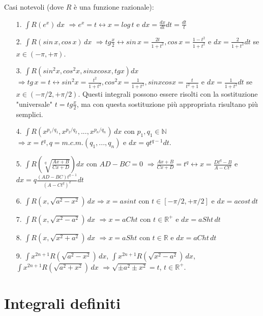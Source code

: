 \documentclass{article}
\theoremstyle{definition}
\theoremstyle{definition}
\theoremstyle{definition}
\theoremstyle{definition}
\theoremstyle{definition}
\theoremstyle{definition}
\begin{document}
Casi notevoli (dove $R$ è una funzione razionale):
\begin{itemize}
    \item [1.] $\displaystyle{\int R(e^x)\,dx}$ $\Longrightarrow e^x=t \longleftrightarrow x=log\,t$ e $\displaystyle{dx=\frac{dx}{dt}dt}=\frac{dt}{t}$
    \item [2.] $\displaystyle{\int R(sin\,x,cos\,x)\,dx}$ $\displaystyle{\Longrightarrow tg\frac{x}{2} \longleftrightarrow sin\,x=\frac{2t}{1+t^2}, cos\,x=\frac{1-t^2}{1+t^2}}$ e $\displaystyle{dx=\frac{2}{1+t^2}dt}$ se $x\in(-\pi,+\pi)$.
    \item [3.] $\displaystyle{\int R(sin^2x,cos^2x,sinxcosx,tgx)dx}$ $\displaystyle{\Longrightarrow tg\,x=t \longleftrightarrow sin^2x=\frac{t^2}{1+t^2}, cos^2x=\frac{1}{1+t^2}, sinxcosx=\frac{t}{t^2+1}}$ e $\displaystyle{dx=\frac{1}{1+t^2}dt}$ se $x\in(-\pi/2,+\pi/2)$.
    Questi integrali possono essere risolti con la sostituzione "universale" $t=tg\frac{x}{2}$, ma con questa sostituzione più appropriata risultano più semplici.
    \item [4.] $\displaystyle{\int R(x^{p_1/q_1},x^{p_2/q_2},...,x^{p_n/q_n})\,dx}$ con $p_1,q_1\in\mathbb{N}$ $\Longrightarrow x=t^q, q=m.c.m.(q_1,...,q_n)$ e $dx=qt^{q-1}dt$.
    \item [5.] $\displaystyle{\int R\left(\sqrt[q]{\frac{Ax+B}{Cx+D}}\right)dx}$ con $AD-BC=0$ $\Longrightarrow \displaystyle{\frac{Ax+B}{Cx+D}=t^q} \longleftrightarrow x=\frac{Dt^q-B}{A-Ct^q}$ e $\displaystyle{dx=q\frac{(AD-BC)t^{q-1}}{(A-Ct^q)^2}dt}$
    \item [6.] $\displaystyle{\int R(x,\sqrt{a^2-x^2})\,dx} \Longrightarrow x=asint$ con $t\in[-\pi/2,+\pi/2]$ e $dx=acost\,dt$
    \item [7.] $\displaystyle{\int R(x, \sqrt{x^2-a^2})\,dx}$ $\Longrightarrow x=aCht$ con $t\in\mathbb{R}^+$ e $dx=aSht\,dt$
    \item [8.] $\displaystyle{\int R(x,\sqrt{x^2+a^2})\,dx}$ $\Longrightarrow x=aSht$ con $t\in\mathbb{R}$ e $dx=aCht\,dt$
    \item [9.] $\displaystyle{\int x^{2n+1}R(\sqrt{a^2-x^2})\,dx}$, $\displaystyle{\int x^{2n+1}R(\sqrt{x^2-a^2})\,dx}$,$\displaystyle{\int x^{2n+1}R(\sqrt{a^2+x^2})\,dx}$ $\Longrightarrow \sqrt{\pm a^2 \pm x^2}=t$, $t\in\mathbb{R}^+$.
\end{itemize}

\newpage
\section{Integrali definiti}
\end{document}
